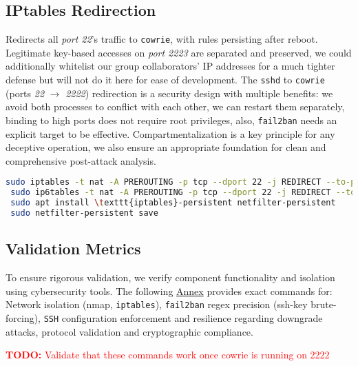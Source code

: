 \documentclass{cls/ULBreport}
\newcommand{\todo}[1]{\textcolor{red}{\textbf{TODO:} #1}}
\begin{document}
        \subsection{IPtables Redirection}
        Redirects all \textit{port 22}'s traffic to \texttt{cowrie}, with rules persisting after reboot. Legitimate key-based accesses on \textit{port 2223} are separated and preserved, we could additionally whitelist our group collaborators' IP addresses for a much tighter defense but will not do it here for ease of development. The \texttt{sshd} to \texttt{cowrie} ({ports \textit{22}} $\rightarrow$ \textit{2222}) redirection is a security design with multiple benefits: we avoid both processes to conflict with each other, we can restart them separately, binding to high ports does not require root privileges, also, \texttt{fail2ban} needs an explicit target to be effective. Compartmentalization is a key principle for any deceptive operation, we also ensure an appropriate foundation for clean and comprehensive post-attack analysis.
        \begin{lstlisting}[language=bash,caption={Traffic Redirection to Cowrie}]
 sudo iptables -t nat -A PREROUTING -p tcp --dport 22 -j REDIRECT --to-port 2222
 sudo ip6tables -t nat -A PREROUTING -p tcp --dport 22 -j REDIRECT --to-port 2222
 sudo apt install \texttt{iptables}-persistent netfilter-persistent
 sudo netfilter-persistent save
        \end{lstlisting}
        


        \subsection{Validation Metrics}  
        \label{sec:validation}  
        
        To ensure rigorous validation, we verify component functionality and isolation using cybersecurity tools. The following \hyperref[annexes:network]{Annex} provides exact commands for:  Network isolation (nmap, \texttt{iptables}), \texttt{fail2ban} regex precision (ssh-key brute-forcing), \texttt{SSH} configuration enforcement and resilience regarding downgrade attacks, protocol validation and cryptographic compliance.
        
    \todo{Validate that these commands work once cowrie is running on 2222}






    
\end{document}
